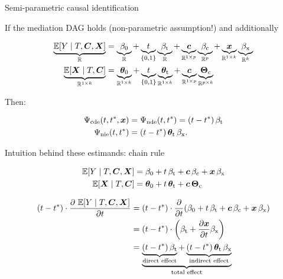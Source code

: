 \documentclass{beamer}
\theoremstyle{remark}
\renewcommand{\c}{\bm c}
\newcommand{\x}{\bm x}
\newcommand{\C}{\bm C}
\newcommand{\X}{\bm X}
\newcommand{\thetazero}{\bm \theta_0}
\newcommand{\thetat}{\bm \theta_\text{t}}
\newcommand{\Thetac}{\bm \Theta_\text{c}}
\newcommand{\betazero}{\beta_0}
\newcommand{\betat}{\beta_\text{t}}
\newcommand{\betac}{\beta_\text{c}}
\newcommand{\betax}{\beta_\text{x}}
\newcommand{\cde}{\Psi_\text{cde} \paren*{t, t^*, \x}}
\newcommand{\nde}{\Psi_\text{nde} \paren*{t, t^*}}
\newcommand{\nie}{\Psi_\text{nie} \paren*{t, t^*}}
\DeclarePairedDelimiter{\paren}{(}{)}
\DeclarePairedDelimiter{\brac}{[}{]}
\newcommand{\E}[2][]{%
   \ifthenelse{ \equal{#1}{} }
      {\ensuremath{\mathbb{E} \brac*{#2}}}
      {\ensuremath{\mathbb{E} \brac*{#2 \mid #1}}}
}
\begin{document}
\begin{frame}{Semi-parametric causal identification}

    If the mediation DAG holds (non-parametric assumption!) and additionally

    \begin{align*}
        \underbrace{\E[T, \C, \X]{Y}}_{\mathbb R}
         & = \underbrace{\betazero}_{\mathbb R}
        + \underbrace{t}_{\{0, 1\}} \underbrace{\betat}_{\mathbb R}
        + \underbrace{\c}_{\mathbb R^{1 \times p}} \underbrace{\betac}_{\mathbb R^p}
        + \underbrace{\x}_{\mathbb R^{1 \times k}} \underbrace{\betax}_{\mathbb R^k} \\
        \underbrace{\E[T, \C]{\X}}_{\mathbb R^{1 \times k}}
         & = \underbrace{\thetazero}_{\mathbb R^{1 \times k}}
        + \underbrace{t}_{\{0, 1\}} \underbrace{\thetat}_{\mathbb R^{1 \times k}}
        + \underbrace{\c}_{\mathbb R^{1 \times p}} \underbrace{\Thetac}_{\mathbb R^{p \times k}}
    \end{align*}

    Then:

    \begin{align*}
        \cde & = \nde = \paren*{t - t^*} \, \betat      \\
        \nie & = \paren*{t - t^*} \, \thetat \, \betax.
    \end{align*}

\end{frame}

\begin{frame}{Intuition behind these estimands: chain rule}

    \begin{align*}
        \E[T, \C, \X]{Y}
         & = \betazero
        + t \, \betat
        + \c \, \betac
        + \x \, \betax  \\
        \E[T, \C]{\X}
         & = \thetazero
        + t \, \thetat
        + \c \, \Thetac
    \end{align*}

    \begin{align*}
        \paren*{t - t^*}  \cdot \frac{\partial \ \E[T, \C, \X]{Y}}{\partial t}
         & = \paren*{t - t^*}  \cdot \frac{\partial}{\partial t} \paren*{\betazero + t \, \betat + \c \, \betac + \x \, \betax } \\
         & = \paren*{t - t^*}  \cdot \paren*{\betat + \frac{\partial \x}{\partial t} \betax}                                     \\
         & =
        \underbrace{
            \underbrace{\paren*{t - t^*} \, \betat}_\text{direct effect} + \underbrace{\paren*{t - t^*} \, \thetat \, \betax}_\text{indirect effect}
        }_\text{total effect}
    \end{align*}

\end{frame}
\end{document}
